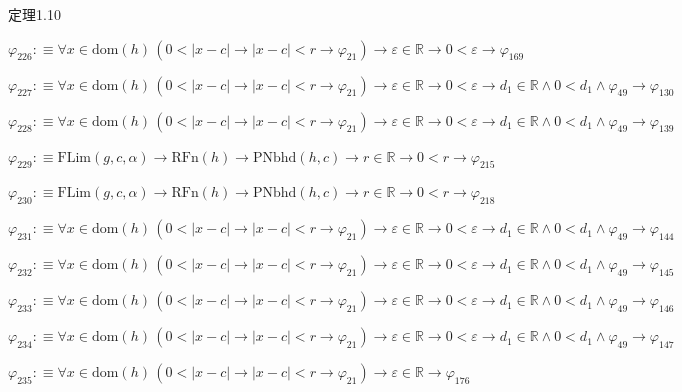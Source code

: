 \begin{fullproof}{定理1.10}
\begin{abbrevlist}
\item $\varphi_{226} :\equiv \forall x \in \mathrm{dom}(h)\,(0 < \lvert x - c \rvert \to \lvert x - c \rvert < r \to \varphi_{21}) \to \varepsilon \in \mathbb{R} \to 0 < \varepsilon \to \varphi_{169}$
\item $\varphi_{227} :\equiv \forall x \in \mathrm{dom}(h)\,(0 < \lvert x - c \rvert \to \lvert x - c \rvert < r \to \varphi_{21}) \to \varepsilon \in \mathbb{R} \to 0 < \varepsilon \to d_{1} \in \mathbb{R} \land 0 < d_{1} \land \varphi_{49} \to \varphi_{130}$
\item $\varphi_{228} :\equiv \forall x \in \mathrm{dom}(h)\,(0 < \lvert x - c \rvert \to \lvert x - c \rvert < r \to \varphi_{21}) \to \varepsilon \in \mathbb{R} \to 0 < \varepsilon \to d_{1} \in \mathbb{R} \land 0 < d_{1} \land \varphi_{49} \to \varphi_{139}$
\item $\varphi_{229} :\equiv \mathrm{FLim}(g,c,\alpha) \to \mathrm{RFn}(h) \to \mathrm{PNbhd}(h,c) \to r \in \mathbb{R} \to 0 < r \to \varphi_{215}$
\item $\varphi_{230} :\equiv \mathrm{FLim}(g,c,\alpha) \to \mathrm{RFn}(h) \to \mathrm{PNbhd}(h,c) \to r \in \mathbb{R} \to 0 < r \to \varphi_{218}$
\item $\varphi_{231} :\equiv \forall x \in \mathrm{dom}(h)\,(0 < \lvert x - c \rvert \to \lvert x - c \rvert < r \to \varphi_{21}) \to \varepsilon \in \mathbb{R} \to 0 < \varepsilon \to d_{1} \in \mathbb{R} \land 0 < d_{1} \land \varphi_{49} \to \varphi_{144}$
\item $\varphi_{232} :\equiv \forall x \in \mathrm{dom}(h)\,(0 < \lvert x - c \rvert \to \lvert x - c \rvert < r \to \varphi_{21}) \to \varepsilon \in \mathbb{R} \to 0 < \varepsilon \to d_{1} \in \mathbb{R} \land 0 < d_{1} \land \varphi_{49} \to \varphi_{145}$
\item $\varphi_{233} :\equiv \forall x \in \mathrm{dom}(h)\,(0 < \lvert x - c \rvert \to \lvert x - c \rvert < r \to \varphi_{21}) \to \varepsilon \in \mathbb{R} \to 0 < \varepsilon \to d_{1} \in \mathbb{R} \land 0 < d_{1} \land \varphi_{49} \to \varphi_{146}$
\item $\varphi_{234} :\equiv \forall x \in \mathrm{dom}(h)\,(0 < \lvert x - c \rvert \to \lvert x - c \rvert < r \to \varphi_{21}) \to \varepsilon \in \mathbb{R} \to 0 < \varepsilon \to d_{1} \in \mathbb{R} \land 0 < d_{1} \land \varphi_{49} \to \varphi_{147}$
\item $\varphi_{235} :\equiv \forall x \in \mathrm{dom}(h)\,(0 < \lvert x - c \rvert \to \lvert x - c \rvert < r \to \varphi_{21}) \to \varepsilon \in \mathbb{R} \to \varphi_{176}$

\end{abbrevlist}
\end{fullproof}
